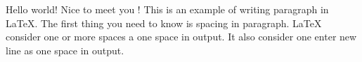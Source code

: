 \documentclass[12pt,a4paper]{article}
\begin{document}
 	Hello world! Nice to meet you !  This is an example of writing paragraph in \LaTeX{}.
 The first thing you need to know is spacing in paragraph.
 \LaTeX{} consider one or more spaces a one space in output.
 It also consider one enter new line as one space in output.
 
\end{document}
